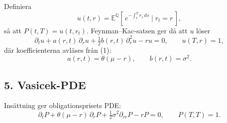\documentclass{article}
\begin{document}
Definiera
\begin{equation}
u(t,r) = \mathbb{E}^{\mathbb{Q}}\!\left[\, e^{-\int_t^T r_s\,ds} \;\Big|\; r_t = r \,\right],
\end{equation}
så att $P(t,T) = u(t, r_t)$. Feynman--Kac-satsen ger då att $u$ löser
\[
\partial_t u + a(r,t)\,\partial_r u + \tfrac{1}{2} b(r,t)\,\partial_r^2 u - r u = 0,
\qquad u(T,r) = 1,
\]
där koefficienterna avläses från (1):
\[
a(r,t) = \theta(\mu - r), \qquad b(r,t) = \sigma^2.
\]

\subsection*{5. Vasicek-PDE}

Insättning ger obligationsprisets PDE:
\[
\boxed{\;\partial_t P + \theta(\mu - r)\,\partial_r P + \tfrac{1}{2}\sigma^2 \partial_{rr} P - r P = 0, \qquad P(T,T) = 1.\;}
\]
\end{document}
